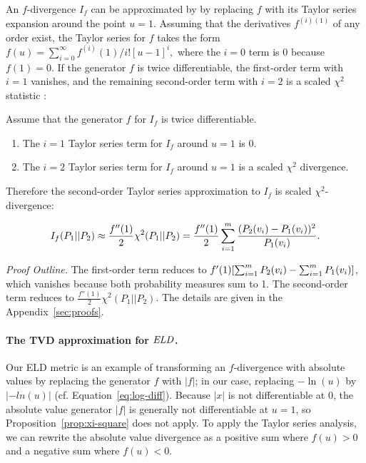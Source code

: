 {An $f$-divergence $I_{f}$ can be approximated by  by replacing $f$ with its Taylor series expansion around the point $u=1$. Assuming that the derivatives $f^{(i)(1)}$ of any order exist, the Taylor series for $f$ takes the form $f(u) = \sum_{i=0}^{\infty} f^{(i)}(1)/i! [u-1]^{i},$ where the $i=0$ term is 0 because $f(1) = 0$. If the generator $f$ is twice differentiable, the first-order term with $i=1$ vanishes, and the remaining second-order term with $i=2$ is a scaled $\chi^{2}$ statistic \citep{Nielsen2014}:

\begin{proposition} \label{prop:xi-square}
Assume that the generator $f$ for $I_{f}$ is twice differentiable.   

\begin{enumerate}
\item The $i=1$ Taylor series term for  $I_{f}$ around $u=1$ is 0.
\item The $i=2$ Taylor series term for  $I_{f}$ around $u=1$ is a scaled $\chi^{2}$ divergence.
\end{enumerate}


Therefore the second-order Taylor series approximation to $I_{f}$ is scaled $\chi^{2}$-divergence:

$$I_{f}(P_{1}||P_{2}) \approx \frac{f''(1)}{2} \chi^{2}(P_{1}||P_{2}) = \frac{f''(1)}{2} 
\sum_{i=1}^{m}  \frac{(P_{2}(v_{i})-P_{1}(v_{i}))^{2}}
 {P_{1}(v_{i})}.$$ 
\end{proposition} 
{\em Proof Outline.} 
The first-order term reduces to $f'(1) [\sum_{i=1}^{m} P_{2}(v_{i}) - \sum_{i=1}^{m} P_{1}(v_{i})]$, which vanishes because both probability measures sum to 1. The second-order term reduces to $ \frac{f''(1)}{2} \chi^{2}(P_{1}||P_{2})$. The details are given in the Appendix~\ref{sec:proofs}. 

\paragraph{The TVD approximation for $\it{ELD}$.}

Our ELD metric is an example of transforming an $f$-divergence with absolute values by replacing the generator $f$ with $|f|$; in our case, replacing $-\ln(u)$ by $|-ln(u)|$ (cf. Equation~\eqref{eq:log-diff}). Because $|x|$ is not differentiable at 0,  the absolute value generator $|f|$ is generally not differentiable at $u=1$, so Proposition~\ref{prop:xi-square} does not apply. To apply the Taylor series analysis, we can rewrite the absolute value divergence as a positive sum where $f(u)>0$ and a negative sum where $f(u) < 0$. 

}
